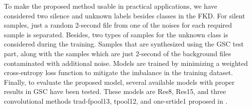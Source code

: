 \documentclass{article}
\begin{document}
To make the proposed method usable in practical applications, we have considered two silence and unknown labels besides classes in the FKD. For silent samples, just a random 2-second file from one of the noises for each required sample is separated. Besides, two types of samples for the unknown class is considered during the training. Samples that are synthesized using the GSC test part, along with the samples which are just 2-second of the background files contaminated with additional noise.  Models are trained by minimizing a weighted cross-entropy loss function to mitigate the imbalance in the training dataset. Finally, to evaluate the proposed model, several available models with proper results in GSC have been tested. These models are Res8, Res15, and three convolutional methods trad-fpool13, tpool12, and one-srtide1 proposed in \cite{cnnsmall}.
\end{document}

